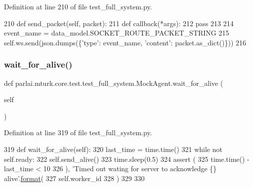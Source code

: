 Definition at line 210 of file test\+\_\+full\+\_\+system.\+py.


\begin{DoxyCode}
210     \textcolor{keyword}{def }send\_packet(self, packet):
211         \textcolor{keyword}{def }callback(*args):
212             \textcolor{keywordflow}{pass}
213 
214         event\_name = data\_model.SOCKET\_ROUTE\_PACKET\_STRING
215         self.ws.send(json.dumps(\{\textcolor{stringliteral}{'type'}: event\_name, \textcolor{stringliteral}{'content'}: packet.as\_dict()\}))
216 
\end{DoxyCode}
\mbox{\label{classparlai_1_1mturk_1_1core_1_1test_1_1test__full__system_1_1MockAgent_a92e5fffe32ac3011adeedbdc34b5506c}} 
\subsubsection{\texorpdfstring{wait\+\_\+for\+\_\+alive()}{wait\_for\_alive()}}
{\footnotesize\ttfamily def parlai.\+mturk.\+core.\+test.\+test\+\_\+full\+\_\+system.\+Mock\+Agent.\+wait\+\_\+for\+\_\+alive (\begin{DoxyParamCaption}\item[{}]{self }\end{DoxyParamCaption})}



Definition at line 319 of file test\+\_\+full\+\_\+system.\+py.


\begin{DoxyCode}
319     \textcolor{keyword}{def }wait\_for\_alive(self):
320         last\_time = time.time()
321         \textcolor{keywordflow}{while} \textcolor{keywordflow}{not} self.ready:
322             self.send\_alive()
323             time.sleep(0.5)
324             \textcolor{keyword}{assert} (
325                 time.time() - last\_time < 10
326             ), \textcolor{stringliteral}{'Timed out wating for server to acknowledge \{\} alive'}.\hyperlink{namespaceparlai_1_1chat__service_1_1services_1_1messenger_1_1shared__utils_a32e2e2022b824fbaf80c747160b52a76}{format}(
327                 self.worker\_id
328             )
329 
330 
\end{DoxyCode}


